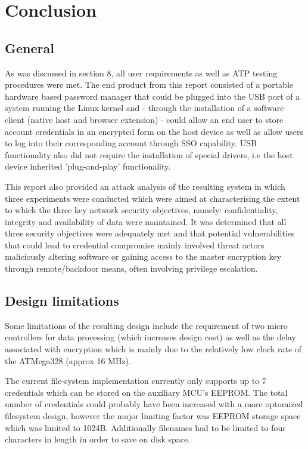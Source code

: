 \section{Conclusion}
\subsection{General}
As was discussed in section 8, all user requirements as well as ATP testing procedures were met. The end product from this report consisted of a portable hardware based password manager that could be plugged into the USB port of a system running the Linux kernel and - through the installation of a software client (native host and browser extension) - could allow an end user to store account credentials in an encrypted form on the host device as well as allow users to log into their corresponding account through SSO capability. USB functionality also did not require the installation of special drivers, i.e the host device inherited 'plug-and-play' functionality. 

This report also provided an attack analysis of the resulting system in which three experiments were conducted which were aimed at characterising the extent to which the three key network security objectives, namely: confidentiality, integrity and availability of data were maintained. It was determined that all three security objectives were adequately met and that potential vulnerabilities that could lead to credential compromise mainly involved threat actors maliciously altering software or gaining access to the master encryption key through remote/backdoor means, often involving privilege escalation.

\subsection{Design limitations}

Some limitations of the resulting design include the requirement of two micro controllers for data processing (which increases design cost) as well as the delay associated with encryption which is mainly due to the relatively low clock rate of the ATMega328 (approx 16 MHz). 

The current file-system implementation currently only supports up to 7 credentials which can be stored on the auxiliary MCU's EEPROM. The total number of credentials could probably have been increased with a more optomized filesystem design, however the major limiting factor was EEPROM storage space which was limited to 1024B. Additionally filenames had to be limited to four characters in length in order to save on disk space.

